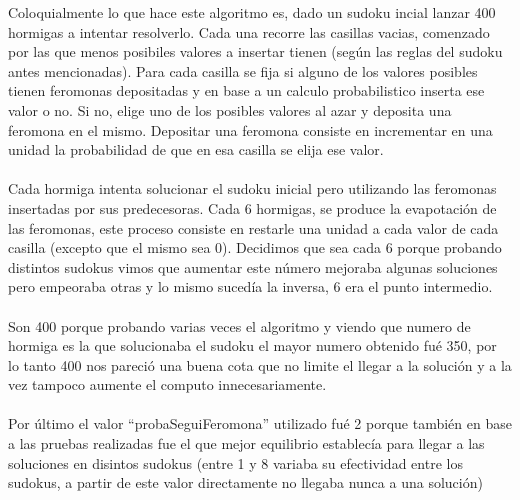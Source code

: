 Coloquialmente lo que hace este algoritmo es, dado un sudoku incial lanzar 400 hormigas a intentar resolverlo. Cada una recorre las casillas vacias, comenzado por las que menos posibiles valores a insertar tienen (seg\'un las reglas del sudoku antes mencionadas). Para cada casilla se fija si alguno de los valores posibles tienen feromonas depositadas y en base a un calculo probabilistico inserta ese valor o no. Si no, elige uno de los posibles valores al azar y deposita una feromona en el mismo. Depositar una feromona consiste en incrementar en una unidad la probabilidad de que en esa casilla se elija ese valor.
\\
\\
Cada hormiga intenta solucionar el sudoku inicial pero utilizando las feromonas insertadas por sus predecesoras. Cada 6 hormigas, se produce la evapotaci\'on de las feromonas, este proceso consiste en restarle una unidad a cada valor de cada casilla (excepto que el mismo sea 0). Decidimos que sea cada 6 porque probando distintos sudokus vimos que aumentar este n\'umero mejoraba algunas soluciones pero empeoraba otras y lo mismo sucedía la inversa, 6 era el punto intermedio.
\\
\\
Son 400 porque probando varias veces el algoritmo y viendo que numero de hormiga es la que solucionaba el sudoku el mayor numero obtenido fué 350, por lo tanto 400 nos pareció una buena cota que no limite el llegar a la solución y a la vez tampoco aumente el computo innecesariamente.
\\
\\
Por \'ultimo el valor ``probaSeguiFeromona'' utilizado fué 2 porque tambi\'en en base a las pruebas realizadas fue el que mejor equilibrio establec\'ia para llegar a las soluciones en disintos sudokus (entre 1 y 8 variaba su efectividad entre los sudokus, a partir de este valor directamente no llegaba nunca a una soluci\'on)
